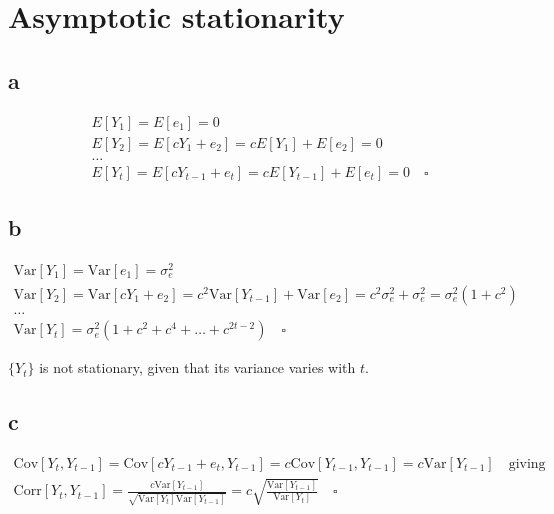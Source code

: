 \documentclass[]{book}
\theoremstyle{definition}
\theoremstyle{definition}
\theoremstyle{remark}
\begin{document}
\section{Asymptotic stationarity}\label{asymptotic-stationarity}

\subsection*{a}\label{a-16}

\begin{gather*}
  E[Y_1] = E[e_1] = 0\\
  E[Y_2] = E[cY_{1}+e_2] = cE[Y_1] + E[e_2] = 0\\
  \dots\\
  E[Y_t] = E[cY_{t-1}+e_t] = cE[Y_{t-1}] + E[e_t] = 0\quad \square
\end{gather*}

\subsection*{b}\label{b-16}

\begin{gather*}
  \text{Var}[Y_1] = \text{Var}[e_1] = \sigma_e^2\\
  \text{Var}[Y_2] = \text{Var}[cY_{1} + e_2] = c^2\text{Var}[Y_{t-1}] + \text{Var}[e_2] = c^2\sigma_e^2 + \sigma_e^2 = \sigma_e^2(1 + c^2)\\
  \dots\\
  \text{Var}[Y_t] = \sigma_e^2(1 + c^2 + c^4 + \dots + c^{2t-2}) \quad\square
\end{gather*}

\(\{Y_t\}\) is not stationary, given that its variance varies with
\(t\).

\subsection*{c}\label{c-10}

\begin{gather*}
  \text{Cov}[Y_t, Y_{t-1}] = \text{Cov}[cY_{t-1} + e_t, Y_{t-1}] = c\text{Cov}[Y_{t-1}, Y_{t-1}] = c\text{Var}[Y_{t-1}]\quad \text{giving}\\
  \text{Corr}[Y_t, Y_{t-1}] = \frac{c\text{Var}[Y_{t-1}]}{\sqrt{\text{Var}[Y_t]\text{Var}[Y_{t-1}]}} =
    c \sqrt{\frac{\text{Var}[Y_{t-1}]}{\text{Var}[Y_t]}}\quad\square
\end{gather*}
\end{document}
